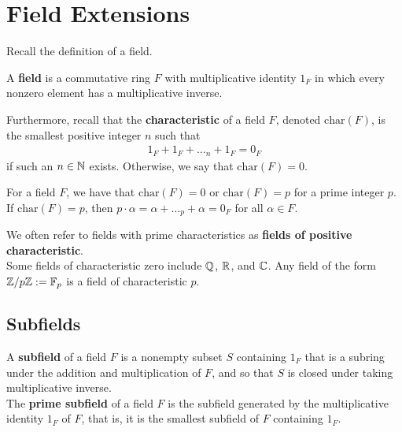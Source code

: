 \documentclass{memoir}
\begin{document}


\chapter{Field Extensions}
\label{cha:field_extensions}

Recall the definition of a field.
\begin{defn}
	A \textbf{field} is a commutative ring \(F\) with multiplicative identity \(1_F\) in which every nonzero element has a multiplicative inverse.
\end{defn}
Furthermore, recall that the \textbf{characteristic} of a field \(F\), denoted \(\textrm{char}(F)\), is the smallest positive integer \(n\) such that
\begin{align*}
	1_F + 1_F + \ldots_n + 1_F = 0_F
\end{align*}
if such an \(n \in \mathbb{N}\) exists. Otherwise, we say that \(\textrm{char}(F)=0\).

\begin{prop}
	For a field \(F\), we have that \(\textrm{char}(F)=0\) or \(\textrm{char}(F) = p\) for a prime integer \(p\). If \(\textrm{char}(F) = p\), then \(p\cdot \alpha  = \alpha + \ldots_p + \alpha  = 0_F\) for all \(\alpha  \in F\).
\end{prop}
We often refer to fields with prime characteristics as \textbf{fields of positive characteristic}.\\

Some fields of characteristic zero include \(\mathbb{Q}\), \(\mathbb{R}\), and \(\mathbb{C}\). Any field of the form \(\mathbb{Z} / p\mathbb{Z} := \mathbb{F}_p\) is a field of characteristic \(p\).

\section{Subfields}
\label{sec:subfields}

\begin{defn}
	A \textbf{subfield} of a field \(F\) is a nonempty subset \(S\) containing \(1_F\) that is a subring under the addition and multiplication of \(F\), and so that \(S\) is closed under taking multiplicative inverse.\\

	The \textbf{prime subfield} of a field \(F\) is the subfield generated by the multiplicative identity \(1_F\) of \(F\), that is, it is the smallest subfield of \(F\) containing \(1_F\).
\end{defn}
\end{document}
